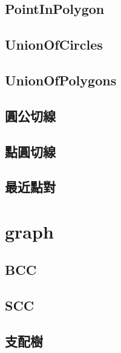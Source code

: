 \documentclass[a4paper,10pt,twocolumn,oneside]{article}
\begin{document}
    \subsection{PointInPolygon}
    

    \subsection{UnionOfCircles}
    

    \subsection{UnionOfPolygons}
    

    \subsection{圓公切線}
    

    \subsection{點圓切線}
    

    \subsection{最近點對}
    
\section{graph}
    \subsection{BCC}
    

    \subsection{SCC}
    

    \subsection{支配樹}
    
\end{document}
